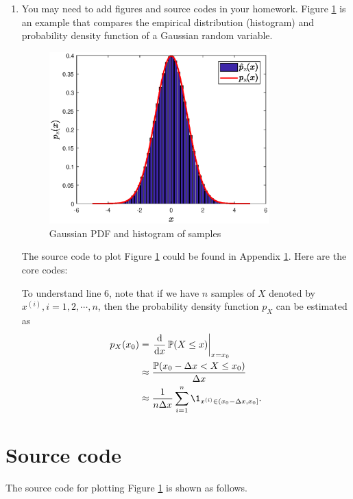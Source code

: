 \documentclass[a4paper]{article}
\begin{document}
\begin{enumerate}
  \item You may need to add figures and source codes in your homework. Figure \ref{fig:1} is an example that compares the empirical distribution (histogram) and probability density function of a Gaussian random variable.
    \begin{figure}[htbp]
      \centering
      \includegraphics[width = 0.8\textwidth]{pdf_normal.eps}
      \caption{Gaussian PDF and histogram of samples}
      \label{fig:1}
    \end{figure}

  The source code to plot Figure \ref{fig:1} could be found in Appendix \ref{sec:a:code}. Here are the core codes:
  
  
  To understand line 6, note that if we have $n$ samples of $X$ denoted by $x^{(i)}, i = 1, 2, \cdots, n$, then the probability density function $p_{X}$ can be estimated as
  \begin{equation*}
    \begin{aligned}
      p_{X}(x_0) &= \left.\frac{\mathrm{d}}{\mathrm{d}x} \Prob(X \leq x) \right|_{x = x_0} \\
      &\approx \frac{\Prob(x_0 - \Delta x < X \leq x_0)}{\Delta x}\\
      &\approx \frac{1}{n\Delta x} \sum_{i = 1}^n \1_{x^{(i)} \in (x_0 - \Delta x, x_0]}.
    \end{aligned}    
  \end{equation*}
    
\end{enumerate}
  
  \newpage
  
  \appendix
  \section{Source code}
  \label{sec:a:code}
  The source code for plotting Figure \ref{fig:1} is shown as follows.
  
  
\end{document}
